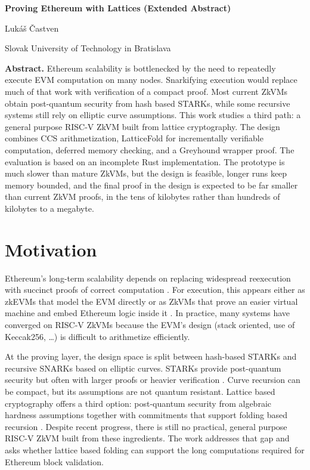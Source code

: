 \documentclass[10pt,a4paper]{article}
\begin{document}
\begin{center}
	{\Large\bfseries Proving Ethereum with Lattices (Extended Abstract)\par}
	\vspace{0.35em}
	{\normalsize Luk\'{a}\v{s} \v{C}astven\par}
	{\small Slovak University of Technology in Bratislava\par}
\end{center}
\small
\thispagestyle{plain}

\noindent\textbf{Abstract.} Ethereum scalability is bottlenecked by the need
to repeatedly execute EVM computation on many nodes. Snarkifying execution
would replace much of that work with verification of a compact proof. Most
current ZkVMs obtain post-quantum security from hash based STARKs, while some
recursive systems still rely on elliptic curve assumptions. This work
studies a third path: a general purpose RISC-V ZkVM built from lattice
cryptography. The design combines CCS arithmetization, LatticeFold for
incrementally verifiable computation, deferred memory checking, and a
Greyhound wrapper proof. The evaluation is based on an incomplete Rust
implementation. The prototype is much slower than mature ZkVMs, but the design
is feasible, longer runs keep memory bounded, and the final proof in the design
is expected to be far smaller than current ZkVM proofs, in the tens of
kilobytes rather than hundreds of kilobytes to a megabyte.

\section*{Motivation}

Ethereum's long-term scalability depends on replacing widespread reexecution
with succinct proofs of correct computation \cite{buterin}. For execution,
this appears either as zkEVMs that model the EVM directly or as ZkVMs that
prove an easier virtual machine and embed Ethereum logic inside it
\cite{sokzkvms}. In practice, many systems have converged on RISC-V ZkVMs
because the EVM's design (stack oriented, use of Keccak256, \ldots)
is difficult to arithmetize efficiently.

At the proving layer, the design space is split between hash-based STARKs and
recursive SNARKs based on elliptic curves. STARKs provide post-quantum
security but often with larger proofs or heavier verification \cite{stark}.
Curve recursion can be compact, but its assumptions are not quantum resistant.
Lattice based cryptography offers a third option: post-quantum security from
algebraic hardness assumptions together with commitments that support folding
based recursion \cite{ajtai,latticezkp,latticefold}. Despite recent progress,
there is still no practical, general purpose RISC-V ZkVM built from these
ingredients. The work addresses that gap and asks whether lattice based
folding can support the long computations required for Ethereum block validation.
\end{document}
